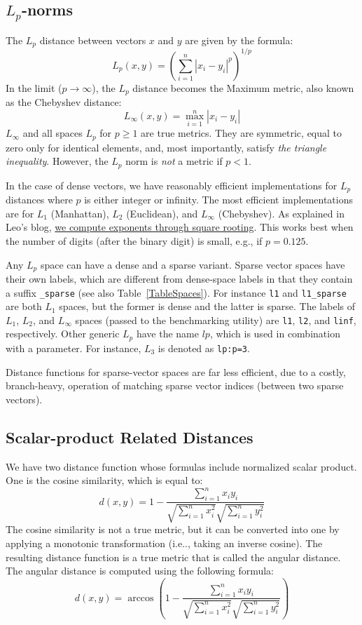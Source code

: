\documentclass[runningheads,a4paper]{llncs}
\newcommand{\ttt}[1]{\texttt{#1}}
\begin{document}
{\subsection{$L_p$-norms}\label{SectionLP}
The $L_p$ distance between vectors $x$ and $y$ are
given by the formula:
\begin{equation}\label{EqMink}
L_p(x,y) = \left(\sum_{i=1}^n |x_i-y_i|^p\right)^{1/p}
\end{equation}
In the limit ($p \rightarrow \infty$),
the $L_p$ distance becomes the Maximum metric, also known as 
the Chebyshev distance:
\begin{equation}\label{EqCheb}
L_{\infty}(x,y) = \max\limits_{i=1}^n |x_i-y_i|
\end{equation}
$L_{\infty}$ and all spaces $L_p$ for $p \ge 1$
are true metrics. 
They are symmetric, equal to zero only for identical elements,
and, most importantly, satisfy \emph{the triangle inequality}.
However, the $L_p$ norm is \emph{not} a metric if $p<1$.

In the case of dense vectors, 
we have reasonably efficient implementations 
for $L_p$ distances where $p$ is either integer or infinity. 
The most efficient implementations are for $L_1$ (Manhattan),
$L_2$ (Euclidean), and $L_{\infty}$ (Chebyshev).
As explained in Leo's blog,
\href{http://searchivarius.org/blog/efficient-exponentiation-square-rooting}{we compute exponents through square rooting}. 
This works best when the number of digits (after the binary digit) is small, e.g., if $p=0.125$.

Any $L_p$ space can have a dense and a sparse variant.
Sparse vector spaces have their own labels, which are different
from dense-space labels in that they contain a suffix \ttt{\_sparse} (see also Table~\ref{TableSpaces}).
For instance \texttt{l1} and \texttt{l1\_sparse} are both $L_1$ spaces,
but the former is dense and the latter is sparse.
The labels of $L_1$, $L_2$, and $L_\infty$ spaces (passed to the benchmarking utility) are
\ttt{l1}, \ttt{l2}, and \ttt{linf}, respectively.
Other generic $L_p$ have the name $lp$, which is used in combination with a parameter.
For instance, $L_3$ is denoted as \ttt{lp:p=3}.

Distance functions for sparse-vector spaces are far less efficient, 
due to a costly, branch-heavy, operation of matching sparse vector indices
(between two sparse vectors).

\subsection{Scalar-product Related Distances}
We have two distance function whose formulas include normalized scalar product.
One is the cosine similarity, which is equal to:
$$
d(x,y) =1-\frac{\sum_{i=1}^n x_i y_i} 
{\sqrt{\sum_{i=1}^n x_i^2} \sqrt{\sum_{i=1}^n y_i^2 } } 
$$ 
The cosine similarity is not a true metric, but it can be converted into
one by applying a monotonic transformation (i.e.., taking an inverse cosine).
The resulting distance function is a true metric that 
is called the angular distance.
The angular distance is computed using the following formula:
$$
d(x,y) =\arccos\left(1-\frac{\sum_{i=1}^n x_i y_i} 
{\sqrt{\sum_{i=1}^n x_i^2} \sqrt{\sum_{i=1}^n y_i^2 } }\right) 
$$ 

}
\end{document}
